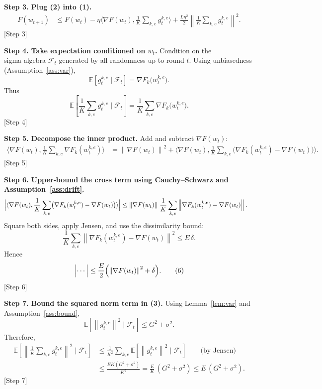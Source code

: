 \documentclass{article}
\newcommand{\E}{\mathbb{E}}
\newcommand{\norm}[1]{\left\|#1\right\|}
\newcommand{\iprod}[2]{\langle #1,#2\rangle}
\begin{document}
\noindent\textbf{Step 3.  Plug (2) into (1).}
\begin{align}
F(w_{t+1})
&\le F(w_t)-\eta\iprod{\nabla F(w_t)}{ \frac{1}{K}\sum_{k,e} g_{t}^{k,e}}
   +\frac{L\eta^2}{2}
     \norm{\frac{1}{K}\sum_{k,e} g_{t}^{k,e}}^2 .
\tag{3}
\end{align}
[Step 3]

\noindent\textbf{Step 4.  Take expectation conditioned on $w_t$.}
Condition on the sigma‑algebra $\mathcal{F}_t$ generated by all randomness up to round $t$.
Using unbiasedness (Assumption~\ref{ass:var}),
\[
\E\!\left[g_{t}^{k,e}\mid\mathcal{F}_t\right]=\nabla F_k\!\bigl(w_{t}^{k,e}\bigr).
\]
Thus
\[
\E\!\left[\frac{1}{K}\sum_{k,e} g_{t}^{k,e}\mid\mathcal{F}_t\right]
 =\frac{1}{K}\sum_{k,e}\nabla F_k\!\bigl(w_{t}^{k,e}\bigr).
\tag{4}
\]
[Step 4]

\noindent\textbf{Step 5.  Decompose the inner product.}
Add and subtract $\nabla F(w_t)$:
\begin{align}
\iprod{\nabla F(w_t)}{\frac{1}{K}\sum_{k,e}\nabla F_k(w_{t}^{k,e})}
&=\norm{\nabla F(w_t)}^2
   +\iprod{\nabla F(w_t)}{\frac{1}{K}\sum_{k,e}
      \bigl(\nabla F_k(w_{t}^{k,e})-\nabla F(w_t)\bigr)} .
\tag{5}
\end{align}
[Step 5]

\noindent\textbf{Step 6.  Upper‑bound the cross term using Cauchy–Schwarz and
Assumption~\ref{ass:drift}.}
\begin{align}
\Bigl|\iprod{\nabla F(w_t)}{\frac{1}{K}\sum_{k,e}
      \bigl(\nabla F_k(w_{t}^{k,e})-\nabla F(w_t)\bigr)}\Bigr|
&\le \norm{\nabla F(w_t)}\,
      \frac{1}{K}\sum_{k,e}
      \norm{\nabla F_k(w_{t}^{k,e})-\nabla F(w_t)} .
\end{align}
Square both sides, apply Jensen, and use the dissimilarity bound:
\[
\frac{1}{K}\sum_{k,e}\norm{\nabla F_k(w_{t}^{k,e})-\nabla F(w_t)}^2
\le E\,\delta .
\]
Hence
\[
\Bigl|\cdots\Bigr|\le \frac{E}{2}\Bigl(\norm{\nabla F(w_t)}^2+\delta\Bigr).
\tag{6}
\]
[Step 6]

\noindent\textbf{Step 7.  Bound the squared norm term in (3).}
Using Lemma~\ref{lem:var} and Assumption~\ref{ass:bound},
\[
\E\!\left[\norm{g_{t}^{k,e}}^2\mid\mathcal{F}_t\right]
\le G^2+\sigma^2 .
\]
Therefore,
\begin{align}
\E\!\left[\norm{\frac{1}{K}\sum_{k,e} g_{t}^{k,e}}^2\mid\mathcal{F}_t\right]
&\le \frac{1}{K^2}\sum_{k,e}\E\!\left[\norm{g_{t}^{k,e}}^2\mid\mathcal{F}_t\right]
   \qquad\text{(by Jensen)}\\
&\le \frac{E K (G^2+\sigma^2)}{K^2}
   =\frac{E}{K}\,(G^2+\sigma^2)
   \le E\,(G^2+\sigma^2) .
\tag{7}
\end{align}
[Step 7]
\end{document}
